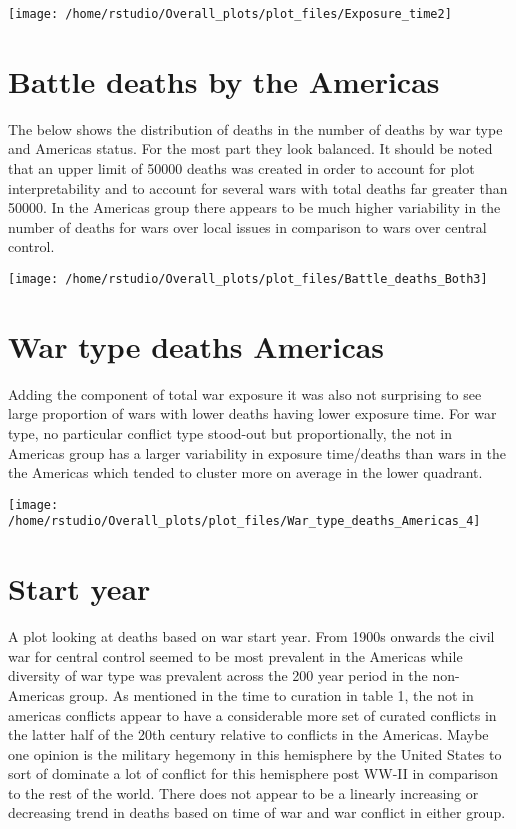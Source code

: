 \documentclass[
]{article}
\begin{document}
\texttt{[image: /home/rstudio/Overall\_plots/plot\_files/Exposure\_time2]}

\hypertarget{battle-deaths-by-the-americas}{%
\section{Battle deaths by the
Americas}\label{battle-deaths-by-the-americas}}

The below shows the distribution of deaths in the number of deaths by
war type and Americas status. For the most part they look balanced. It
should be noted that an upper limit of 50000 deaths was created in order
to account for plot interpretability and to account for several wars
with total deaths far greater than 50000. In the Americas group there
appears to be much higher variability in the number of deaths for wars
over local issues in comparison to wars over central control.

\texttt{[image: /home/rstudio/Overall\_plots/plot\_files/Battle\_deaths\_Both3]}

\hypertarget{war-type-deaths-americas}{%
\section{War type deaths Americas}\label{war-type-deaths-americas}}

Adding the component of total war exposure it was also not surprising to
see large proportion of wars with lower deaths having lower exposure
time. For war type, no particular conflict type stood-out but
proportionally, the not in Americas group has a larger variability in
exposure time/deaths than wars in the the Americas which tended to
cluster more on average in the lower quadrant.

\texttt{[image: /home/rstudio/Overall\_plots/plot\_files/War\_type\_deaths\_Americas\_4]}

\hypertarget{start-year}{%
\section{Start year}\label{start-year}}

A plot looking at deaths based on war start year. From 1900s onwards the
civil war for central control seemed to be most prevalent in the
Americas while diversity of war type was prevalent across the 200 year
period in the non-Americas group. As mentioned in the time to curation
in table 1, the not in americas conflicts appear to have a considerable
more set of curated conflicts in the latter half of the 20th century
relative to conflicts in the Americas. Maybe one opinion is the military
hegemony in this hemisphere by the United States to sort of dominate a
lot of conflict for this hemisphere post WW-II in comparison to the rest
of the world. There does not appear to be a linearly increasing or
decreasing trend in deaths based on time of war and war conflict in
either group.
\end{document}
